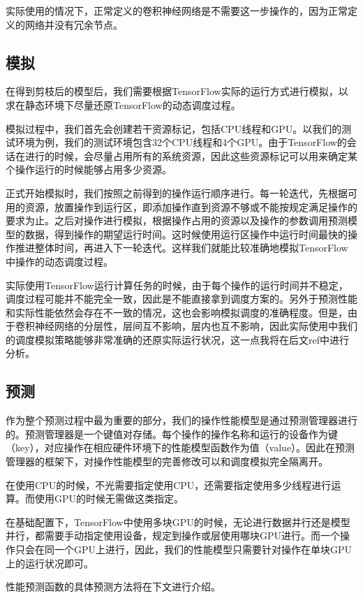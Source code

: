    实际使用的情况下，正常定义的卷积神经网络是不需要这一步操作的，因为正常定义的网络并没有冗余节点。

\subsection{模拟}
    在得到剪枝后的模型后，我们需要根据TensorFlow实际的运行方式进行模拟，以求在静态环境下尽量还原TensorFlow的动态调度过程。
    
    模拟过程中，我们首先会创建若干资源标记，包括CPU线程和GPU。以我们的测试环境为例，我们的测试环境包含32个CPU线程和4个GPU。由于TensorFlow的会话在进行的时候，会尽量占用所有的系统资源，因此这些资源标记可以用来确定某个操作运行的时候能够占用多少资源。
    
    正式开始模拟时，我们按照之前得到的操作运行顺序进行。每一轮迭代，先根据可用的资源，放置操作到运行区，即添加操作直到资源不够或不能按规定满足操作的要求为止。之后对操作进行模拟，根据操作占用的资源以及操作的参数调用预测模型的数据，得到操作的期望运行时间。这时候使用运行区操作中运行时间最快的操作推进整体时间，再进入下一轮迭代。这样我们就能比较准确地模拟TensorFlow中操作的动态调度过程。
    
    实际使用TensorFlow运行计算任务的时候，由于每个操作的运行时间并不稳定，调度过程可能并不能完全一致，因此是不能直接拿到调度方案的。另外于预测性能和实际性能依然会存在不一致的情况，这也会影响模拟调度的准确程度。但是，由于卷积神经网络的分层性，层间互不影响，层内也互不影响，因此实际使用中我们的调度模拟策略能够非常准确的还原实际运行状况，这一点我将在后文ref中进行分析。
    
\subsection{预测}
    作为整个预测过程中最为重要的部分，我们的操作性能模型是通过预测管理器进行的。预测管理器是一个键值对存储。每个操作的操作名称和运行的设备作为键（key），对应操作在相应硬件环境下的性能模型函数作为值（value）。因此在预测管理器的框架下，对操作性能模型的完善修改可以和调度模拟完全隔离开。
    
    在使用CPU的时候，不光需要指定使用CPU，还需要指定使用多少线程进行运算。而使用GPU的时候无需做这类指定。
    
    在基础配置下，TensorFlow中使用多块GPU的时候，无论进行数据并行还是模型并行，都需要手动指定使用设备，规定到操作或层使用哪块GPU进行。而一个操作只会在同一个GPU上进行，因此，我们的性能模型只需要针对操作在单块GPU上的运行状况即可。
    
    性能预测函数的具体预测方法将在下文进行介绍。

